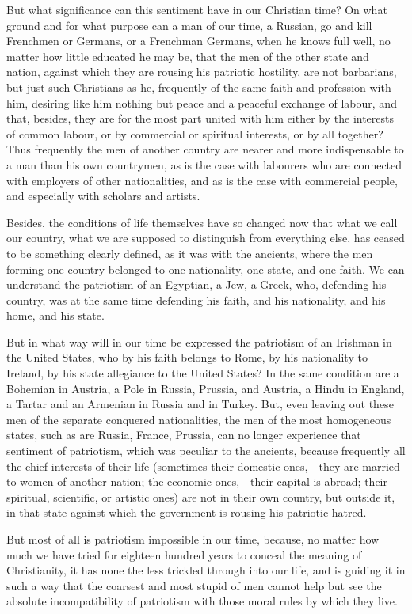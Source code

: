 \documentclass{book}
\begin{document}
But what significance can this sentiment have in our Christian time? On what ground and for what purpose can a man of our time, a Russian, go and kill Frenchmen or Germans, or a Frenchman Germans, when he knows full well, no matter how little educated he may be, that the men of the other state and nation, against which they are rousing his patriotic hostility, are not barbarians, but just such Christians as he, frequently of the same faith and profession with him, desiring like him nothing but peace and a peaceful exchange of labour, and that, besides, they are for the most part united with him either by the interests of common labour, or by commercial or spiritual interests, or by all together? Thus frequently the men of another country are nearer and more indispensable to a man than his own countrymen, as is the case with labourers who are connected with employers of other nationalities, and as is the case with commercial people, and especially with scholars and artists.

Besides, the conditions of life themselves have so changed now that what we call our country, what we are supposed to distinguish from everything else, has ceased to be something clearly defined, as it was with the ancients, where the men forming one country belonged to one nationality, one state, and one faith. We can understand the patriotism of an Egyptian, a Jew, a Greek, who, defending his country, was at the same time defending his faith, and his nationality, and his home, and his state.

But in what way will in our time be expressed the patriotism of an Irishman in the United States, who by his faith belongs to Rome, by his nationality to Ireland, by his state allegiance to the United States? In the same condition are a Bohemian in Austria, a Pole in Russia, Prussia, and Austria, a Hindu in England, a Tartar and an Armenian in Russia and in Turkey. But, even leaving out these men of the separate conquered nationalities, the men of the most homogeneous states, such as are Russia, France, Prussia, can no longer experience that sentiment of patriotism, which was peculiar to the ancients, because frequently all the chief interests of their life (sometimes their domestic ones,—they are married to women of another nation; the economic ones,—their capital is abroad; their spiritual, scientific, or artistic ones) are not in their own country, but outside it, in that state against which the government is rousing his patriotic hatred.

But most of all is patriotism impossible in our time, because, no matter how much we have tried for eighteen hundred years to conceal the meaning of Christianity, it has none the less trickled through into our life, and is guiding it in such a way that the coarsest and most stupid of men cannot help but see the absolute incompatibility of patriotism with those moral rules by which they live.
\end{document}
